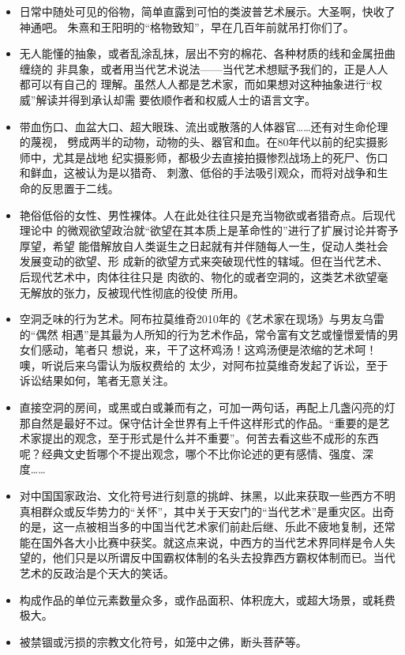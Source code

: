 \begin{itemize}

\item 日常中随处可见的俗物，简单直露到可怕的类波普艺术展示。大圣啊，快收了神通吧。
  朱熹和王阳明的“格物致知”，早在几百年前就吊打你们了。

\item 无人能懂的抽象，或者乱涂乱抹，层出不穷的棉花、各种材质的线和金属扭曲缠绕的
  非具象，或者用当代艺术说法——当代艺术想赋予我们的，正是人人都可以有自己的
  理解。虽然人人都是艺术家，而如果想对这种抽象进行“权威”解读并得到承认却需
  要依顺作者和权威人士的语言文字。

\item 带血伤口、血盆大口、超大眼珠、流出或散落的人体器官……还有对生命伦理的蔑视，
  劈成两半的动物，动物的头、器官和血。在80年代以前的纪实摄影师中，尤其是战地
  纪实摄影师，都极少去直接拍摄惨烈战场上的死尸、伤口和鲜血，这被认为是以猎奇、
  刺激、低俗的手法吸引观众，而将对战争和生命的反思置于二线。

\item 艳俗低俗的女性、男性裸体。人在此处往往只是充当物欲或者猎奇点。后现代理论中
  的微观欲望政治就“欲望在其本质上是革命性的”进行了扩展讨论并寄予厚望，希望
  能借解放自人类诞生之日起就有并伴随每人一生，促动人类社会发展变动的欲望、形
  成新的欲望方式来突破现代性的辖域。但在当代艺术、后现代艺术中，肉体往往只是
  肉欲的、物化的或者空洞的，这类艺术欲望毫无解放的张力，反被现代性彻底的役使
  所用。

\item 空洞乏味的行为艺术。阿布拉莫维奇2010年的《艺术家在现场》与男友乌雷的“偶然
  相遇”是其最为人所知的行为艺术作品，常令富有文艺或憧憬爱情的男女们感动，笔者只
  想说，来，干了这杯鸡汤！这鸡汤便是浓缩的艺术呵！噢，听说后来乌雷认为版权费给的
  太少，对阿布拉莫维奇发起了诉讼，至于诉讼结果如何，笔者无意关注。

\item 直接空洞的房间，或黑或白或兼而有之，可加一两句话，再配上几盏闪亮的灯那自然是最好不过。保守估计全世界有上千件这样形式的作品。“重要的是艺术家提出的观念，至于形式是什么并不重要”。何苦去看这些不成形的东西呢？经典文史哲哪个不提出观念，哪个不比你论述的更有感情、强度、深度……

\item 对中国国家政治、文化符号进行刻意的挑衅、抹黑，以此来获取一些西方不明真相群众或反华势力的“关怀”，其中关于天安门的“当代艺术”是重灾区。出奇的是，这一点被相当多的中国当代艺术家们前赴后继、乐此不疲地复制，还常能在国外各大小比赛中获奖。就这点来说，中西方的当代艺术界同样是令人失望的，他们只是以所谓反中国霸权体制的名头去投靠西方霸权体制而已。当代艺术的反政治是个天大的笑话。

\item 构成作品的单位元素数量众多，或作品面积、体积庞大，或超大场景，或耗费极大。

\item 被禁锢或污损的宗教文化符号，如笼中之佛，断头菩萨等。

\end{itemize}


